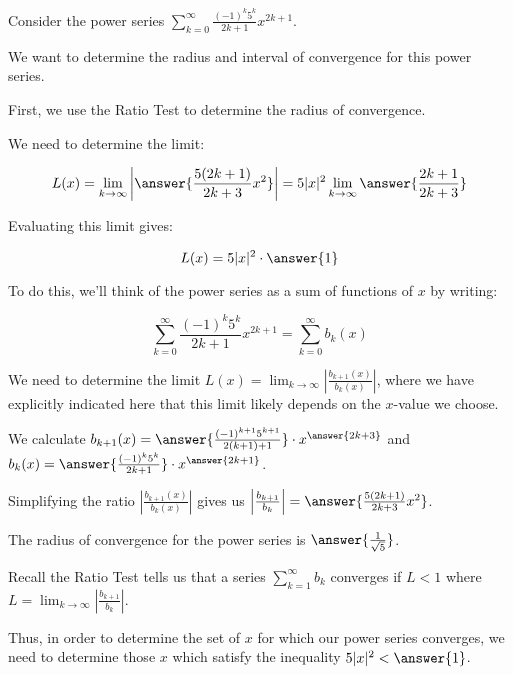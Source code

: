 \documentclass{ximera}
\author{Jim Talamo}
\begin{document}
\begin{exercise}
Consider the power series $\sum_{k=0}^{\infty} \frac{(-1)^k 5^k }{2k+1}x^{2k+1}$.

We want to determine the radius and interval of convergence for this power series. 

First, we use the Ratio Test to determine the radius of convergence. 

We need to determine the limit:

\[
L(x) = \lim_{k \to \infty} \left| \answer{\frac{5 (2k+1)}{2k+3}x^2} \right| = 5|x|^2 \lim_{k \to \infty}  \answer{\frac{2k+1}{2k+3}}
\]

Evaluating this limit gives:

\[
L(x) = 5|x|^2 \cdot \answer{1}
\]

\begin{hint}

To do this, we'll think of the power series as a sum of functions of $x$ by writing: 

\[
\sum_{k=0}^{\infty} \frac{(-1)^k 5^k }{2k+1}x^{2k+1} = \sum_{k=0}^{\infty} b_k(x)
\]

We need to determine the limit $L(x) = \lim_{k \to \infty} \left| \frac{b_{k+1}(x)}{b_k(x)}\right|$, where we have explicitly indicated here that this limit likely depends on the $x$-value we choose. 



We calculate $b_{k+1}(x)=\answer{\frac{(-1)^{k+1} 5^{k+1}}{2(k+1)+1}} \cdot x^{\answer{2k+3}}$ and $b_k(x)=\answer{ \frac{(-1)^k 5^k}{2k+1}} \cdot x^{\answer{2k+1}}$. 

Simplifying the ratio $\left|\frac{b_{k+1}(x)}{b_k(x)}\right|$ gives us $\left|\frac{b_{k+1}}{b_k}\right|=\answer{ \frac{5 (2k+1)}{2k+3}x^2}$. 
\end{hint}





\begin{exercise}

The radius of convergence for the power series is $\answer{\frac{1}{\sqrt{5}}}$.


\begin{hint}

Recall the Ratio Test tells us that a series $\sum^{\infty}_{k=1} b_k$ converges if $L <1$ where $L=\lim_{k \to \infty}\left| \frac{b_{k+1}}{b_k}\right|$. 

Thus, in order to determine the set of $x$ for which our power series converges, we need to determine those $x$ which satisfy 
the inequality $5|x|^2 <\answer{1}$. 


\end{hint}
\end{exercise}
\end{exercise}
\end{document}
